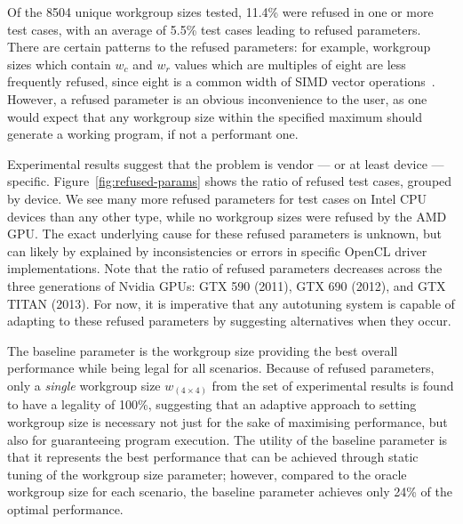 \documentclass{acaces}
\begin{document}
Of the 8504 unique workgroup sizes tested, 11.4\% were refused in one
or more test cases, with an average of 5.5\% test cases leading to
refused parameters. There are certain patterns to the refused
parameters: for example, workgroup sizes which contain $w_c$ and $w_r$
values which are multiples of eight are less frequently refused, since
eight is a common width of SIMD vector
operations~\cite{IntelCorporation2012}. However, a refused parameter
is an obvious inconvenience to the user, as one would expect that any
workgroup size within the specified maximum should generate a working
program, if not a performant one.




Experimental results suggest that the problem is vendor --- or at
least device --- specific. Figure~\ref{fig:refused-params} shows the
ratio of refused test cases, grouped by device. We see many more
refused parameters for test cases on Intel CPU devices than any other
type, while no workgroup sizes were refused by the AMD GPU. The exact
underlying cause for these refused parameters is unknown, but can
likely by explained by inconsistencies or errors in specific OpenCL
driver implementations. Note that the ratio of refused parameters
decreases across the three generations of Nvidia GPUs: GTX 590 (2011),
GTX 690 (2012), and GTX TITAN (2013). For now, it is imperative that
any autotuning system is capable of adapting to these refused
parameters by suggesting alternatives when they occur.

The baseline parameter is the workgroup size providing the best
overall performance while being legal for all scenarios. Because of
refused parameters, only a \emph{single} workgroup size
$w_{(4 \times 4)}$ from the set of experimental results is found to
have a legality of 100\%, suggesting that an adaptive approach to
setting workgroup size is necessary not just for the sake of
maximising performance, but also for guaranteeing program
execution. The utility of the baseline parameter is that it represents
the best performance that can be achieved through static tuning of the
workgroup size parameter; however, compared to the oracle workgroup
size for each scenario, the baseline parameter achieves only 24\% of
the optimal performance.
\end{document}
